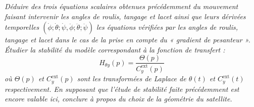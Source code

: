  \question{\label{q_12}}\textit{Déduire des trois équations scalaires obtenues précédemment du mouvement faisant
  intervenir les angles de roulis, tangage et lacet \triplet{\phi}{\theta}{\psi} ainsi que leurs dérivées temporelles $\left(\dot{\phi};\dot{\theta};\dot{\psi},\ddot{\phi};\ddot{\theta};\ddot{\psi}\right)$ les équations vérifiées
  par les angles de roulis, tangage et lacet dans le cas de la prise en
  compte du « gradient de pesanteur ». Étudier la stabilité du modèle
  correspondant à la fonction de transfert :}
    $$
  H_{\theta y}(p)=\dfrac{\Theta(p)}{C_y^{\text{ext}}(p)}
  $$
\textit{  où $\Theta(p)$ et $C_y^{\text{ext}}(p)$ sont les transformées de Laplace de $\theta(t)$ et $C_y^{\text{ext}}(t)$ respectivement. En
  supposant que l'étude de stabilité faite précédemment est encore
  valable ici, conclure à propos du choix de la géométrie du satellite.}
  \ifprof

